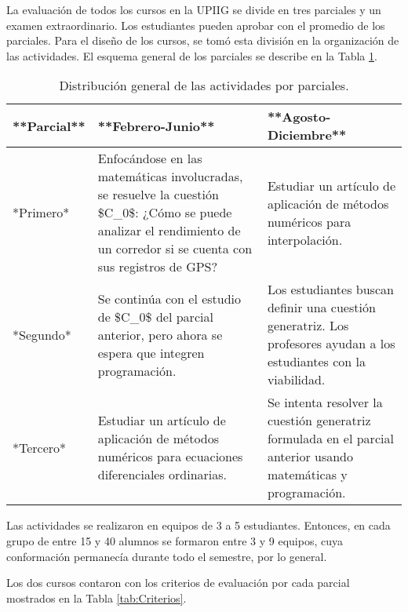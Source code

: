 \documentclass[spanish,]{book}
\begin{document}
La evaluación de todos los cursos en la UPIIG se divide en tres parciales y un examen extraordinario. Los estudiantes pueden aprobar con el promedio de los parciales. Para el diseño de los cursos, se tomó esta división en la organización de las actividades. El esquema general de los parciales se describe en la Tabla \ref{tab:Parciales}.

\begin{table}
  
  \caption{\label{tab:Parciales}Distribución general de las actividades por parciales.}
  \centering
  \begin{tabular}[t]{l|l|l}
  \hline
  **Parcial** & **Febrero-Junio** & **Agosto-Diciembre**\\
  \hline
  *Primero* & Enfocándose en las matemáticas involucradas, se resuelve la cuestión \$C\_0\$: ¿Cómo se puede analizar el rendimiento de un corredor si se cuenta con sus registros de GPS? & Estudiar un artículo de aplicación de métodos numéricos para interpolación.\\
  \hline
  *Segundo* & Se continúa con el estudio de \$C\_0\$ del parcial anterior, pero ahora se espera que integren programación. & Los estudiantes buscan definir una cuestión generatriz. Los profesores ayudan a los estudiantes con la viabilidad.\\
  \hline
  *Tercero* & Estudiar un artículo de aplicación de métodos numéricos para ecuaciones diferenciales ordinarias. & Se intenta resolver la cuestión generatriz formulada en el parcial anterior usando matemáticas y programación.\\
  \hline
  \end{tabular}
  \end{table}

Las actividades se realizaron en equipos de 3 a 5 estudiantes. Entonces, en cada grupo de entre 15 y 40 alumnos se formaron entre 3 y 9 equipos, cuya conformación permanecía durante todo el semestre, por lo general.

Los dos cursos contaron con los criterios de evaluación por cada parcial mostrados en la Tabla \ref{tab:Criterios}.
\end{document}
